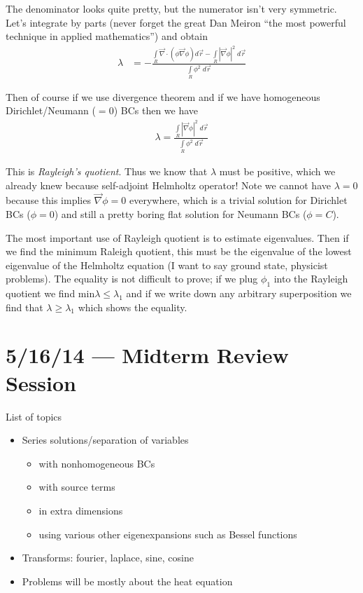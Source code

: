 \documentclass[10pt]{report}
\newcommand{\abs}[1]{\left|#1\right|}
\begin{document}
The denominator looks quite pretty, but the numerator isn't very symmetric. Let's integrate by parts (never forget the great Dan Meiron ``the most powerful technique in applied mathematics'') and obtain
\begin{align}
    \lambda &= -\frac{\int\limits_{R}^{}\vec{\nabla} \cdot \left( \phi \vec{\nabla}\phi \right)d\vec{r} - \int\limits_{R}^{}\abs{\vec{\nabla} \phi}^2\;d\vec{r}}{\int\limits_{R}^{}\phi^2\;d\vec{r}}
\end{align}

Then of course if we use divergence theorem and if we have homogeneous Dirichlet/Neumann ($=0$) BCs then we have
\begin{align}
    \lambda = \frac{\int\limits_{R}^{}\abs{\vec{\nabla}\phi}^2\;d\vec{r}}{\int\limits_{R}^{}\phi^2\;d\vec{r}}
\end{align}

This is \emph{Rayleigh's quotient}. Thus we know that $\lambda$ must be positive, which we already knew because self-adjoint Helmholtz operator! Note we cannot have $\lambda = 0$ because this implies $\vec{\nabla} \phi = 0$ everywhere, which is a trivial solution for Dirichlet BCs ($\phi = 0$) and still a pretty boring flat solution for Neumann BCs ($\phi = C$).

The most important use of Rayleigh quotient is to estimate eigenvalues. Then if we find the minimum Raleigh quotient, this must be the eigenvalue of the lowest eigenvalue of the Helmholtz equation (I want to say ground state, physicist problems). The equality is not difficult to prove; if we plug $\phi_1$ into the Rayleigh quotient we find $\mathrm{min} \lambda \leq \lambda_1$ and if we write down any arbitrary superposition we find that $\lambda \geq \lambda_1$ which shows the equality.
\chapter{5/16/14 --- Midterm Review Session}

List of topics
\begin{itemize}
    \item Series solutions/separation of variables
        \begin{itemize}
            \item with nonhomogeneous BCs
            \item with source terms
            \item in extra dimensions
            \item using various other eigenexpansions such as Bessel functions
        \end{itemize}
    \item Transforms: fourier, laplace, sine, cosine
    \item Problems will be mostly about the heat equation
\end{itemize}
\end{document}
